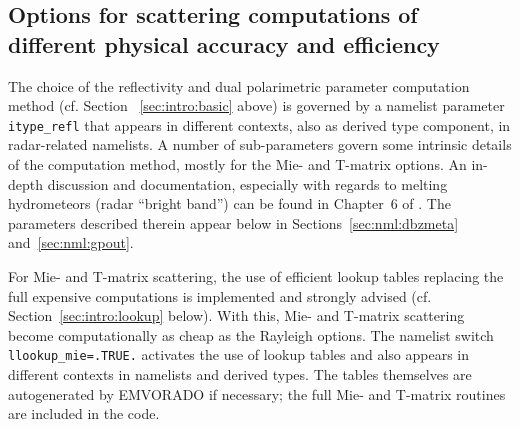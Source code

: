 \documentclass[10pt,a4paper,twoside,headinclude,footinclude,parskip=half]{scrartcl}
\newcommand{\myaktuellesection}{sec:intro}%
\newcommand{\labelsec}[1]{\label{#1}\renewcommand{\myaktuellesection}{#1}}%
\newcommand{\labelsec}[1]{\label{#1}}%
\newcommand{\citeP}[1]{\citet{#1}}
\newcommand{\srcform}[1]{\mbox{\texttt{#1}}\xspace}%
\begin{document}
\subsection{Options for scattering computations of different physical accuracy and efficiency}
\labelsec{sec:intro:dbz}

The choice of the reflectivity and dual polarimetric parameter computation method (cf. Section ~\ref{sec:intro:basic} above) is governed by a namelist parameter \srcform{itype_refl} that appears
in different contexts, also as derived type component, in radar-related namelists.
A number of sub-parameters govern some intrinsic details of the computation method, mostly for the Mie- and T-matrix options.
An in-depth discussion and documentation, especially with regards to melting hydrometeors (radar ``bright band'') can be found in 
Chapter~6 of \citeP{blahak2016a}. The parameters described therein appear below in Sections~\ref{sec:nml:dbzmeta} and~\ref{sec:nml:gpout}.

For Mie- and T-matrix scattering, the use of efficient lookup tables
replacing the full expensive computations is implemented and strongly advised (cf. Section~\ref{sec:intro:lookup} below). With this,
Mie- and T-matrix scattering become computationally as cheap as the Rayleigh options. The namelist switch \srcform{llookup_mie=.TRUE.} activates
the use of lookup tables and also appears in different contexts in namelists and derived types. The tables themselves are autogenerated by EMVORADO
if necessary; the full Mie- and T-matrix routines are included in the code.
\end{document}
